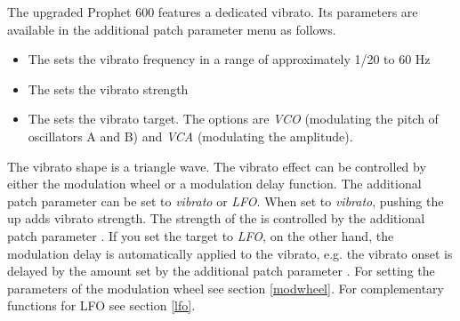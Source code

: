 The upgraded Prophet 600 features a dedicated vibrato. Its parameters are available in the additional patch parameter menu as follows.

\begin{itemize}
  \item The \vibspeed sets the vibrato frequency in a range of approximately 1/20 to 60 Hz
  \item The \vibamt sets the vibrato strength
  \item The \vibtgt sets the vibrato target. The options are \textit{VCO} (modulating the pitch of oscillators A  and B) and \textit{VCA} (modulating the amplitude). 
\end{itemize}

The vibrato shape is a triangle wave. The vibrato effect can be controlled by either the modulation wheel or a modulation delay function. The additional patch parameter \modwheeltarget can be set to \textit{vibrato} or \textit{LFO}. When set to \textit{vibrato}, pushing the \modwheel up adds vibrato strength. The strength of the \modwheel is controlled by the additional patch parameter \modwheelrange. If you set the \modwheel target to \textit{LFO}, on the other hand, the modulation delay is automatically applied to the vibrato, e.g. the vibrato onset is delayed by the amount set by the additional patch parameter \moddelay. For setting the parameters of the modulation wheel see section \ref{modwheel}. For complementary functions for LFO see section \ref{lfo}.
